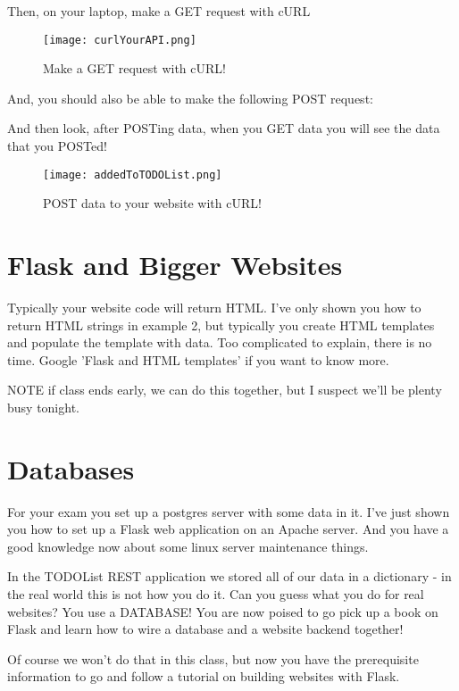 \documentclass[10pt]{article}
\begin{document}
Then, on your laptop, make a GET request with cURL


\begin{figure}[h]
  \centering
    \texttt{[image: curlYourAPI.png]}
  \caption{Make a GET request with cURL!}
\end{figure}

And, you should also be able to make the following POST request:



And then look, after POSTing data, when you GET data you will see the data that you POSTed!

\begin{figure}[h]
  \centering
    \texttt{[image: addedToTODOList.png]}
  \caption{POST data to your website with cURL!}
\end{figure}

\pagebreak

\section{Flask and Bigger Websites}
Typically your website code will return HTML. I've only shown you how to return HTML strings in example 2, but typically you create HTML templates and populate the template with data. Too complicated to explain, there is no time. Google 'Flask and HTML templates' if you want to know more.

NOTE if class ends early, we can do this together, but I suspect we'll be plenty busy tonight.

\section{Databases}
For your exam you set up a postgres server with some data in it. I've just shown you how to set up a Flask web application on an Apache server. And you have a good knowledge now about some linux server maintenance things. 

In the TODOList REST application we stored all of our data in a dictionary - in the real world this is not how you do it. Can you guess what you do for real websites? You use a DATABASE! You are now poised to go pick up a book on Flask and learn how to wire a database and a website backend together!

Of course we won't do that in this class, but now you have the prerequisite information to go and follow a tutorial on building websites with Flask.
\end{document}
